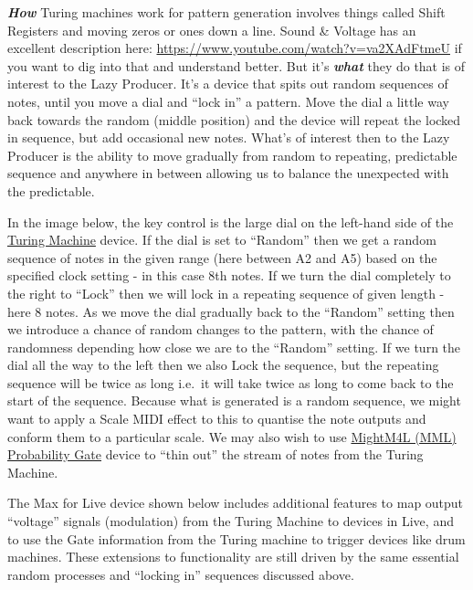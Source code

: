 \documentclass[
  12pt,
  letterpaper,
  oneside,
  open=any]{scrbook}
\begin{document}
\textbf{\emph{How}} Turing machines work for pattern generation involves
things called Shift Registers and moving zeros or ones down a line.
Sound \& Voltage has an excellent description here:
\url{https://www.youtube.com/watch?v=va2XAdFtmeU} if you want to dig
into that and understand better. But it's \textbf{\emph{what}} they do
that is of interest to the Lazy Producer. It's a device that spits out
random sequences of notes, until you move a dial and ``lock in'' a
pattern. Move the dial a little way back towards the random (middle
position) and the device will repeat the locked in sequence, but add
occasional new notes. What's of interest then to the Lazy Producer is
the ability to move gradually from random to repeating, predictable
sequence and anywhere in between allowing us to balance the unexpected
with the predictable.

In the image below, the key control is the large dial on the left-hand
side of the
\href{https://maxforlive.com/library/device/5988/turing-machine}{Turing
Machine} device. If the dial is set to ``Random'' then we get a random
sequence of notes in the given range (here between A2 and A5) based on
the specified clock setting - in this case 8th notes. If we turn the
dial completely to the right to ``Lock'' then we will lock in a
repeating sequence of given length - here 8 notes. As we move the dial
gradually back to the ``Random'' setting then we introduce a chance of
random changes to the pattern, with the chance of randomness depending
how close we are to the ``Random'' setting. If we turn the dial all the
way to the left then we also Lock the sequence, but the repeating
sequence will be twice as long i.e.~it will take twice as long to come
back to the start of the sequence. Because what is generated is a random
sequence, we might want to apply a Scale MIDI effect to this to quantise
the note outputs and conform them to a particular scale. We may also
wish to use
\href{https://maxforlive.com/library/device/6982/mm4l-probability-gate}{MightM4L
(MML) Probability Gate} device to ``thin out'' the stream of notes from
the Turing Machine.

The Max for Live device shown below includes additional features to map
output ``voltage'' signals (modulation) from the Turing Machine to
devices in Live, and to use the Gate information from the Turing machine
to trigger devices like drum machines. These extensions to functionality
are still driven by the same essential random processes and ``locking
in'' sequences discussed above.
\end{document}
